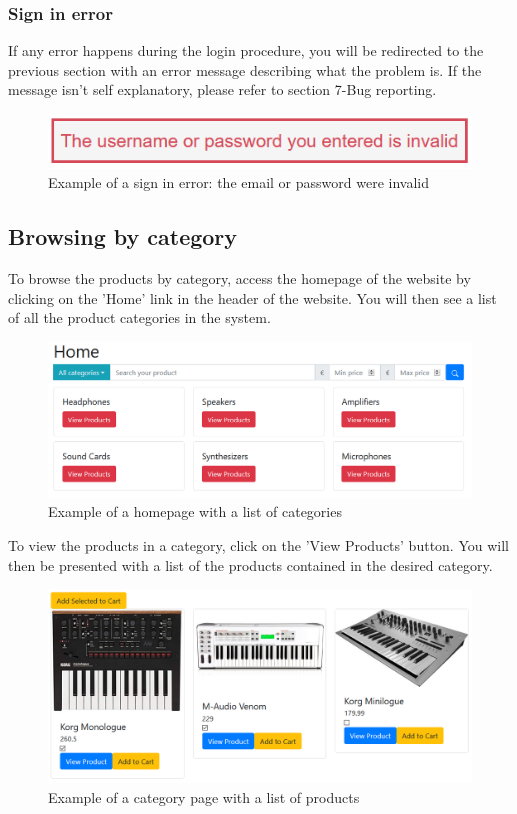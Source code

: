\subsubsection{Sign in error}
If any error happens during the login procedure, you will be redirected to the previous section with an error message describing what the problem is. If the message isn't self explanatory, please refer to section 7-Bug reporting.

\begin{figure}[H]
\centering
\includegraphics[scale=0.6]{res/Immagini/SigninError}
\caption{Example of a sign in error: the email or password were invalid}
\end{figure}

\subsection{Browsing by category}
To browse the products by category, access the homepage of the website by clicking on the 'Home' link in the header of the website. You will then see a list of all the product categories in the system.

\begin{figure}[H]
\centering
\includegraphics[scale=0.6]{res/Immagini/CategoryList}
\caption{Example of a homepage with a list of categories}
\end{figure}

To view the products in a category, click on the 'View Products' button. You will then be presented with a list of the products contained in the desired category.

\begin{figure}[H]
\centering
\includegraphics[scale=0.6]{res/Immagini/CategoryPage}
\caption{Example of a category page with a list of products}
\end{figure}

